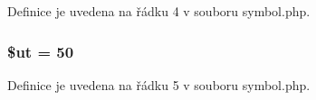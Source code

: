 Definice je uvedena na řádku 4 v souboru symbol.\-php.

\hypertarget{symbol_8php_aadd3f841051043ee58e587e840e8dd0b}{
\subsubsection[{\$ut}]{\setlength{\rightskip}{0pt plus 5cm}\$ut = 50}}\label{symbol_8php_aadd3f841051043ee58e587e840e8dd0b}


Definice je uvedena na řádku 5 v souboru symbol.\-php.

